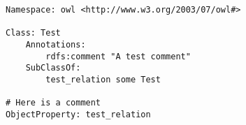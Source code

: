 \documentclass{article}
\begin{document}
\begin{lstlisting}[language=omn]
Namespace: owl <http://www.w3.org/2003/07/owl#>

Class: Test
    Annotations:
        rdfs:comment "A test comment"
    SubClassOf:
        test_relation some Test

# Here is a comment
ObjectProperty: test_relation
\end{lstlisting}
\end{document}
